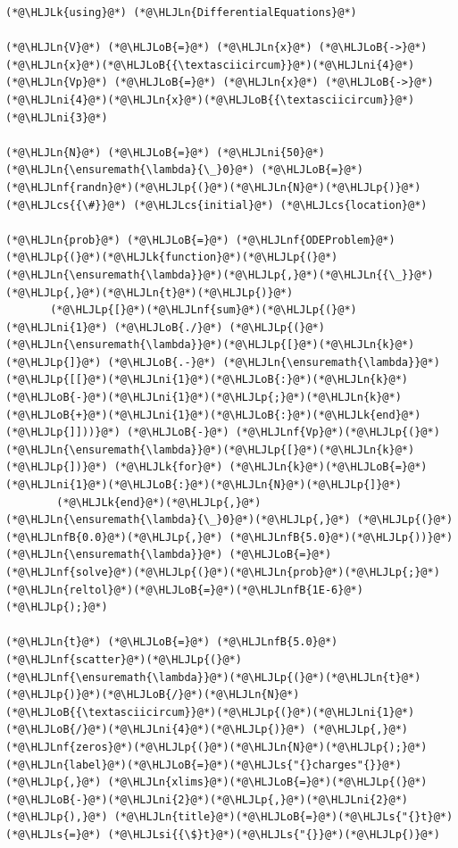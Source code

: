 \documentclass[12pt,a4paper]{article}
\newcommand{\HLJLk}[1]{\textcolor[RGB]{148,91,176}{\textbf{#1}}}
\newcommand{\HLJLn}[1]{#1}
\newcommand{\HLJLnf}[1]{\textcolor[RGB]{66,102,213}{#1}}
\newcommand{\HLJLs}[1]{\textcolor[RGB]{201,61,57}{#1}}
\newcommand{\HLJLsi}[1]{#1}
\newcommand{\HLJLnfB}[1]{\textcolor[RGB]{59,151,46}{#1}}
\newcommand{\HLJLni}[1]{\textcolor[RGB]{59,151,46}{#1}}
\newcommand{\HLJLoB}[1]{\textcolor[RGB]{102,102,102}{\textbf{#1}}}
\newcommand{\HLJLp}[1]{#1}
\newcommand{\HLJLcs}[1]{\textcolor[RGB]{153,153,119}{\textit{#1}}}
\begin{document}
\begin{lstlisting}
(*@\HLJLk{using}@*) (*@\HLJLn{DifferentialEquations}@*)

(*@\HLJLn{V}@*) (*@\HLJLoB{=}@*) (*@\HLJLn{x}@*) (*@\HLJLoB{->}@*) (*@\HLJLn{x}@*)(*@\HLJLoB{{\textasciicircum}}@*)(*@\HLJLni{4}@*)
(*@\HLJLn{Vp}@*) (*@\HLJLoB{=}@*) (*@\HLJLn{x}@*) (*@\HLJLoB{->}@*) (*@\HLJLni{4}@*)(*@\HLJLn{x}@*)(*@\HLJLoB{{\textasciicircum}}@*)(*@\HLJLni{3}@*)

(*@\HLJLn{N}@*) (*@\HLJLoB{=}@*) (*@\HLJLni{50}@*)
(*@\HLJLn{\ensuremath{\lambda}{\_}0}@*) (*@\HLJLoB{=}@*) (*@\HLJLnf{randn}@*)(*@\HLJLp{(}@*)(*@\HLJLn{N}@*)(*@\HLJLp{)}@*)  (*@\HLJLcs{{\#}}@*) (*@\HLJLcs{initial}@*) (*@\HLJLcs{location}@*)

(*@\HLJLn{prob}@*) (*@\HLJLoB{=}@*) (*@\HLJLnf{ODEProblem}@*)(*@\HLJLp{(}@*)(*@\HLJLk{function}@*)(*@\HLJLp{(}@*)(*@\HLJLn{\ensuremath{\lambda}}@*)(*@\HLJLp{,}@*)(*@\HLJLn{{\_}}@*)(*@\HLJLp{,}@*)(*@\HLJLn{t}@*)(*@\HLJLp{)}@*) 
       (*@\HLJLp{[}@*)(*@\HLJLnf{sum}@*)(*@\HLJLp{(}@*)(*@\HLJLni{1}@*) (*@\HLJLoB{./}@*) (*@\HLJLp{(}@*)(*@\HLJLn{\ensuremath{\lambda}}@*)(*@\HLJLp{[}@*)(*@\HLJLn{k}@*)(*@\HLJLp{]}@*) (*@\HLJLoB{.-}@*) (*@\HLJLn{\ensuremath{\lambda}}@*)(*@\HLJLp{[[}@*)(*@\HLJLni{1}@*)(*@\HLJLoB{:}@*)(*@\HLJLn{k}@*)(*@\HLJLoB{-}@*)(*@\HLJLni{1}@*)(*@\HLJLp{;}@*)(*@\HLJLn{k}@*)(*@\HLJLoB{+}@*)(*@\HLJLni{1}@*)(*@\HLJLoB{:}@*)(*@\HLJLk{end}@*)(*@\HLJLp{]]))}@*) (*@\HLJLoB{-}@*) (*@\HLJLnf{Vp}@*)(*@\HLJLp{(}@*)(*@\HLJLn{\ensuremath{\lambda}}@*)(*@\HLJLp{[}@*)(*@\HLJLn{k}@*)(*@\HLJLp{])}@*) (*@\HLJLk{for}@*) (*@\HLJLn{k}@*)(*@\HLJLoB{=}@*)(*@\HLJLni{1}@*)(*@\HLJLoB{:}@*)(*@\HLJLn{N}@*)(*@\HLJLp{]}@*)
        (*@\HLJLk{end}@*)(*@\HLJLp{,}@*) (*@\HLJLn{\ensuremath{\lambda}{\_}0}@*)(*@\HLJLp{,}@*) (*@\HLJLp{(}@*)(*@\HLJLnfB{0.0}@*)(*@\HLJLp{,}@*) (*@\HLJLnfB{5.0}@*)(*@\HLJLp{))}@*)
(*@\HLJLn{\ensuremath{\lambda}}@*) (*@\HLJLoB{=}@*) (*@\HLJLnf{solve}@*)(*@\HLJLp{(}@*)(*@\HLJLn{prob}@*)(*@\HLJLp{;}@*) (*@\HLJLn{reltol}@*)(*@\HLJLoB{=}@*)(*@\HLJLnfB{1E-6}@*)(*@\HLJLp{);}@*)

(*@\HLJLn{t}@*) (*@\HLJLoB{=}@*) (*@\HLJLnfB{5.0}@*)
(*@\HLJLnf{scatter}@*)(*@\HLJLp{(}@*)(*@\HLJLnf{\ensuremath{\lambda}}@*)(*@\HLJLp{(}@*)(*@\HLJLn{t}@*)(*@\HLJLp{)}@*)(*@\HLJLoB{/}@*)(*@\HLJLn{N}@*)(*@\HLJLoB{{\textasciicircum}}@*)(*@\HLJLp{(}@*)(*@\HLJLni{1}@*)(*@\HLJLoB{/}@*)(*@\HLJLni{4}@*)(*@\HLJLp{)}@*) (*@\HLJLp{,}@*)(*@\HLJLnf{zeros}@*)(*@\HLJLp{(}@*)(*@\HLJLn{N}@*)(*@\HLJLp{);}@*) (*@\HLJLn{label}@*)(*@\HLJLoB{=}@*)(*@\HLJLs{"{}charges"{}}@*)(*@\HLJLp{,}@*) (*@\HLJLn{xlims}@*)(*@\HLJLoB{=}@*)(*@\HLJLp{(}@*)(*@\HLJLoB{-}@*)(*@\HLJLni{2}@*)(*@\HLJLp{,}@*)(*@\HLJLni{2}@*)(*@\HLJLp{),}@*) (*@\HLJLn{title}@*)(*@\HLJLoB{=}@*)(*@\HLJLs{"{}t}@*) (*@\HLJLs{=}@*) (*@\HLJLsi{{\$}t}@*)(*@\HLJLs{"{}}@*)(*@\HLJLp{)}@*)
\end{lstlisting}
\end{document}
